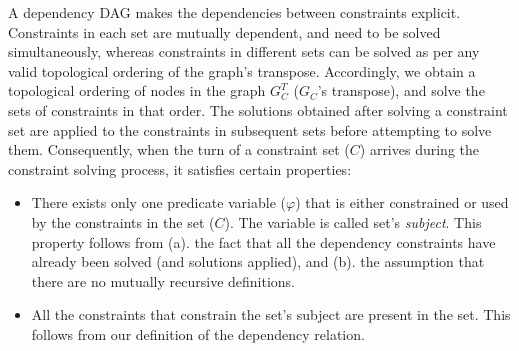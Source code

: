 
A dependency DAG makes the dependencies between constraints explicit.
Constraints in each set are mutually dependent, and need to be solved
simultaneously, whereas constraints in different sets can be solved as
per any valid topological ordering of the graph's transpose.
Accordingly, we obtain a topological ordering of nodes in the graph
$G_{{C}}^{T}$ ($G_C$'s transpose), and solve the sets of constraints
in that order. The solutions obtained after solving a constraint set
are applied to the constraints in subsequent sets before attempting to
solve them.  Consequently, when the turn of a constraint set ($C$)
arrives during the constraint solving process, it satisfies certain
properties:
\begin{itemize}
\item There exists only one predicate variable ($\varphi$) that is either
constrained or used by the constraints in the set ($C$). The variable is
called set's \emph{subject}. This property follows from (a). the fact
that all the dependency constraints have already been solved (and
solutions applied), and (b). the assumption that there are no mutually
recursive definitions. 
\item All the constraints that constrain the set's subject are present
in the set. This follows from our definition of the dependency relation.
\end{itemize}


